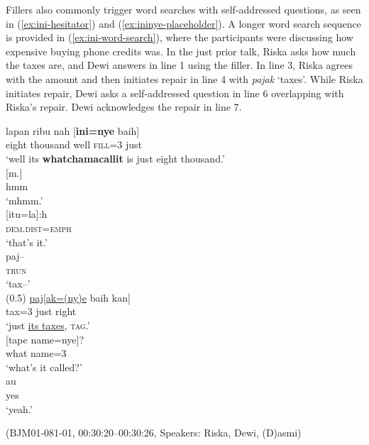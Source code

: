 \documentclass[output=paper,
\ChapterDOI{10.5281/zenodo.15697583}
colorlinks,
citecolor=brown]{langscibook}
\begin{document}
Fillers also commonly trigger word searches with self-addressed questions, as seen in (\ref{ex:ini-hesitator}) and (\ref{ex:ininye-placeholder}). A longer word search sequence is provided in (\ref{ex:ini-word-search}), where the participants were discussing how expensive buying phone credits was. In the just prior talk, Riska asks how much the taxes are, and Dewi answers in line 1 using the filler. In line 3, Riska agrees with the amount and then initiates repair in line 4 with \textit{pajak} `taxes'. While Riska initiates repair, Dewi asks a self-addressed question in line 6 overlapping with Riska's repair. Dewi acknowledges the repair in line 7.


\begin{exe}
\ex\label{ex:ini-word-search}
\begin{xlist}[0\quad →A:]
\gll lapan ribu nah [\textbf{ini=nye} baih]\\
eight thousand well \textsc{fill}=3 just\\
\glt `well its \textbf{whatchamacallit} is just eight thousand.' \\
\gll \hspace{3.25cm}[m.]\\
\hspace{3.25cm}hmm\\
\glt \hspace{3.25cm}`mhmm.' \\
\gll  \hspace{3.25cm}[itu=la]:h\\
 \hspace{3.25cm}\textsc{dem.dist=emph}\\ 
\glt \hspace{3.25cm}`that's it.' \\
\exi{4\quad \hphantom{→R:}}
\gll  paj--\\
 \textsc{trun}\\ 
\glt `tax--' \\
\exi{} (0.5)
\exi{5\quad \hphantom{→R:}}
\gll  \uline{paj[ak=(ny)e} baih kan]\\
 tax=\textsc{3} just right\\ 
\glt `just \uline{its taxes}, \textsc{tag}.' \\
\gll  \hspace{0.35cm}[tape name=nye]?\\
 \hspace{0.35cm}what name=\textsc{3}\\ 
\glt \hspace{0.35cm}`what's it called?'\\
\exi{7\quad \hphantom{→D:}}
\gll au\\
yes\\
\glt `yeah.' \\
\end{xlist}
\hfill (BJM01-081-01, 00:30:20--00:30:26, Speakers: Riska, Dewi, (D)asmi)
\end{exe}
\end{document}
